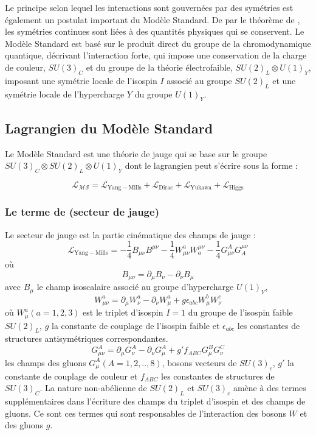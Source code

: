 Le principe selon lequel les interactions sont gouvernées par des symétries est également un postulat important du Modèle Standard. De par le théorème de , les symétries continues sont liées à des quantités physiques qui se conservent. Le Modèle Standard est basé sur le produit direct du groupe de la chromodynamique quantique, décrivant l'interaction forte, qui impose une conservation de la charge de couleur, $SU(3)_{C}$ et du groupe de la théorie électrofaible, $SU(2)_{L} \otimes U(1)_{Y}$, imposant une symétrie locale de l'isospin $I$ associé au groupe $SU(2)_{L}$ et une symétrie locale de l'hypercharge $Y$ du groupe $U(1)_{Y}$.

\subsection{Lagrangien du Modèle Standard}
Le Modèle Standard est une théorie de jauge qui se base sur le groupe $SU(3)_{C} \otimes SU(2)_{L} \otimes U(1)_{Y}$ dont le lagrangien peut s'écrire sous la forme :

\begin{equation}
\mathcal{L_{MS}}=\mathcal{L}_{\mathrm{Yang-Mills}}+\mathcal{L}_{\mathrm{Dirac}}+\mathcal{L}_{\mathrm{Yukawa}}+\mathcal{L}_{\mathrm{Higgs}}
\end{equation}

\subsubsection{Le terme de  (secteur de jauge)}
Le secteur de jauge est la partie cinématique des champs de jauge :
\begin{equation}
\mathcal{L}_{\mathrm{Yang-Mills}}=-\frac{1}{4}B_{\mu\nu}B^{\mu\nu}-\frac{1}{4}W_{\mu\nu}^{a}W_{a}^{\mu\nu}-\frac{1}{4}G_{\mu\nu}^{A}G_{A}^{\mu\nu}
\end{equation}
où 
\begin{equation}
B_{\mu\nu}=\partial_{\mu}B_{\nu}-\partial_{\nu}B_{\mu}
\end{equation}
avec $B_{\mu}$ le champ isoscalaire associé au groupe d'hypercharge $U(1)_{Y}$,
\begin{equation}
W_{\mu\nu}^{a}=\partial_{\mu}W_{\nu}^{a}-\partial_{\nu}W_{\mu}^{a}+g\epsilon_{abc}W_{\mu}^{b}W_{\nu}^{c}
\end{equation}
où $W_{\mu}^{a} (a=1,2,3)$ est le triplet d'isospin $I=\num{1}$ du groupe de l'isospin faible $SU(2)_{L}$, $g$ la constante de couplage de l'isospin faible et $\epsilon_{abc}$ les constantes de structures antisymétriques correspondantes.  
\begin{equation}
G_{\mu\nu}^{A}=\partial_{\mu}G_{\nu}^{A}-\partial_{\nu}G_{\mu}^{A}+g'f_{ABC}G_{\mu}^{B}G_{\nu}^{C}
\end{equation}
les champs des gluons $G_{\mu}^{A} (A=1,2,..,8)$, bosons vecteurs de $SU(3)_{c}$, $g'$ la constante de couplage de couleur et $f_{ABC}$ les constantes de structures de $SU(3)_{C}$.
La nature non-abélienne de $SU(2)_{L}$ et $SU(3)_{c}$ amène à des termes supplémentaires dans l'écriture des champs du triplet d'isospin et des champs de gluons. Ce sont ces termes qui sont responsables de l'interaction des bosons $W$ et des gluons $g$.

